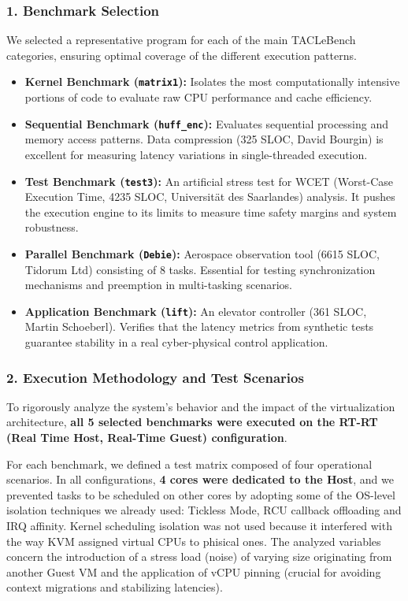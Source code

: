 \subsubsection{1. Benchmark Selection}\label{benchmark-selection}

We selected a representative program for each of the main TACLeBench
categories, ensuring optimal coverage of the different execution
patterns.

\begin{itemize}
\item
  \textbf{Kernel Benchmark (\texttt{matrix1}):} Isolates the most
  computationally intensive portions of code to evaluate raw CPU
  performance and cache efficiency.
\item
  \textbf{Sequential Benchmark (\texttt{huff\_enc}):} Evaluates
  sequential processing and memory access patterns. Data compression
  (325 SLOC, David Bourgin) is excellent for measuring latency
  variations in single-threaded execution.
\item
  \textbf{Test Benchmark (\texttt{test3}):} An artificial stress test
  for WCET (Worst-Case Execution Time, 4235 SLOC, Universität des
  Saarlandes) analysis. It pushes the execution engine to its limits to
  measure time safety margins and system robustness.
\item
  \textbf{Parallel Benchmark (\texttt{Debie}):} Aerospace observation
  tool (6615 SLOC, Tidorum Ltd) consisting of 8 tasks. Essential for
  testing synchronization mechanisms and preemption in multi-tasking
  scenarios.
\item
  \textbf{Application Benchmark (\texttt{lift}):} An elevator controller
  (361 SLOC, Martin Schoeberl). Verifies that the latency metrics from
  synthetic tests guarantee stability in a real cyber-physical control
  application.
\end{itemize}

\subsubsection{2. Execution Methodology and Test
Scenarios}\label{execution-methodology-and-test-scenarios}

To rigorously analyze the system's behavior and the impact of the
virtualization architecture, \textbf{all 5 selected benchmarks were
executed on the RT-RT (Real Time Host, Real-Time Guest) configuration}.

For each benchmark, we defined a test matrix composed of four
operational scenarios. In all configurations, \textbf{4 cores were
dedicated to the Host}, and we prevented tasks to be scheduled on other
cores by adopting some of the OS-level isolation techniques we already
used: Tickless Mode, RCU callback offloading and IRQ affinity. Kernel
scheduling isolation was not used because it interfered with the way KVM
assigned virtual CPUs to phisical ones. The analyzed variables concern
the introduction of a stress load (noise) of varying size originating
from another Guest VM and the application of vCPU pinning (crucial for
avoiding context migrations and stabilizing latencies).

